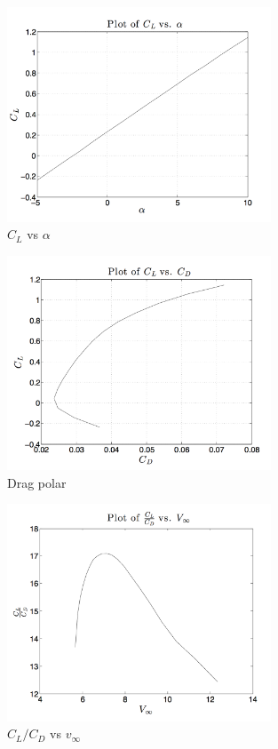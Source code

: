 \documentclass[11pt]{article}
\begin{document}
    \begin{figure}[h!]
    	\centering
    	\includegraphics[width=0.7\textwidth]{Figures/PS3/CL_vs_alpha.png}
    	\caption{$C_L$ vs $\alpha$}\label{fig:cl-alpha}
    \end{figure}
    \begin{figure}[h!]
    	\centering
    	\includegraphics[width=0.7\textwidth]{Figures/PS3/CL_vs_CD.png}
    	\caption{Drag polar}\label{fig:cl-cd}
    \end{figure}
    \begin{figure}[h!]
    	\centering
    	\includegraphics[width=0.7\textwidth]{Figures/PS3/CL-CD_vs_V.png}
    	\caption{$C_L/C_D$ vs $v_\infty$}\label{fig:LD-v}
    \end{figure}
\end{document}
